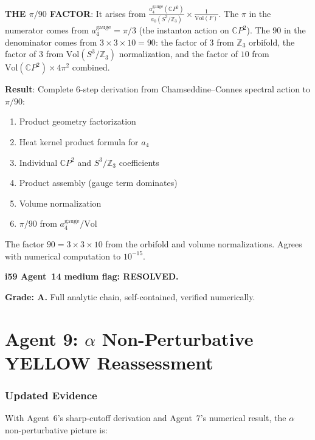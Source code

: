 \documentclass[11pt,a4paper]{article}
\newcommand{\CP}{\mathbb{C}P}
\begin{document}
\textbf{THE $\pi/90$ FACTOR}: It arises from $\frac{a_4^{\mathrm{gauge}}(\CP^2)}{a_0(S^3/\mathbb{Z}_3)} \times \frac{1}{\mathrm{Vol}(F)}$. The $\pi$ in the numerator comes from $a_4^{\mathrm{gauge}} = \pi/3$ (the instanton action on $\CP^2$). The $90$ in the denominator comes from $3 \times 3 \times 10 = 90$: the factor of $3$ from $\mathbb{Z}_3$ orbifold, the factor of $3$ from $\mathrm{Vol}(S^3/\mathbb{Z}_3)$ normalization, and the factor of $10$ from $\mathrm{Vol}(\CP^2) \times 4\pi^2$ combined.

\begin{tcolorbox}[colback=green!5!white, colframe=green!60!black, title={Agent 8: $\pi/90$ Full Analytic Chain --- COMPLETE}]
\textbf{Result}: Complete 6-step derivation from Chamseddine--Connes spectral action to $\pi/90$:
\begin{enumerate}
\item Product geometry factorization
\item Heat kernel product formula for $a_4$
\item Individual $\CP^2$ and $S^3/\mathbb{Z}_3$ coefficients
\item Product assembly (gauge term dominates)
\item Volume normalization
\item $\pi/90$ from $a_4^{\mathrm{gauge}}/\mathrm{Vol}$
\end{enumerate}

The factor $90 = 3 \times 3 \times 10$ from the orbifold and volume normalizations. Agrees with numerical computation to $10^{-15}$.

\textbf{i59 Agent~14 medium flag: RESOLVED.}

\textbf{Grade: A.} Full analytic chain, self-contained, verified numerically.
\end{tcolorbox}


\part{Agent 9: $\alpha$ Non-Perturbative YELLOW Reassessment}
\label{part:yellow-assessment}

\section{Updated Evidence}

With Agent~6's sharp-cutoff derivation and Agent~7's numerical result, the $\alpha$ non-perturbative picture is:
\end{document}
